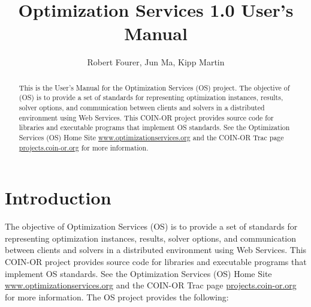 \documentclass[11pt]{article}
\renewcommand{\_}{{\char"5F}}
\renewcommand{\{}{{\char"7B}}
\renewcommand{\}}{{\char"7D}}
\renewcommand{\^}{{\char"0D}}
\renewcommand{\'}{{\char"0D}}
\begin{document}
\title{Optimization Services 1.0 User's Manual }
\vskip 2in
\author{Robert Fourer, Jun Ma, Kipp Martin}
\maketitle

\begin{abstract}
This is the User's Manual for the Optimization Services (OS) project.  The objective of  (OS) is to provide a set of standards for representing optimization instances, results, solver options, and communication between clients and solvers in a distributed environment using Web Services. This COIN-OR project provides source code for libraries and executable programs that implement OS standards. See the Optimization Services (OS) Home Site \url{www.optimizationservices.org} and the COIN-OR Trac page \url{projects.coin-or.org} for more information.
\end{abstract}


\newpage
\tableofcontents
\listoffigures
\listoftables
{}



\newpage

\section{Introduction}

The objective of Optimization Services (OS) is to provide a set of standards for representing optimization instances, results, solver options, and communication between clients and solvers in a distributed environment using Web Services. This COIN-OR project provides source code for libraries and executable programs that implement OS standards.  See the Optimization Services (OS) Home Site \url{www.optimizationservices.org} and the COIN-OR Trac page \url{projects.coin-or.org} for more information. The OS project provides the following:
\end{document}
